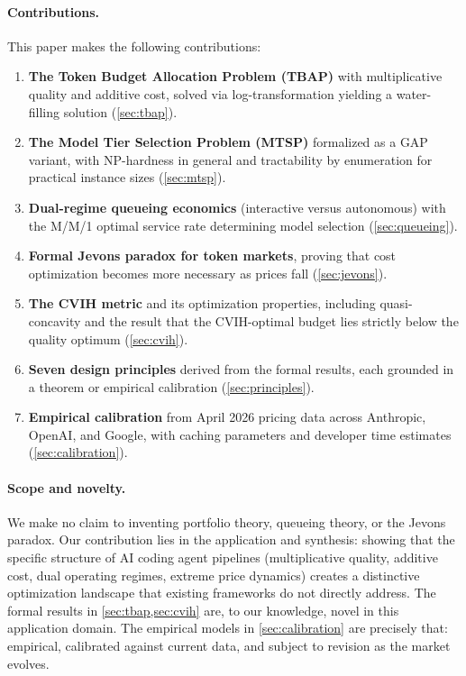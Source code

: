 \documentclass[11pt, a4paper, copyright]{googledeepmind}
\begin{document}
\paragraph{Contributions.}
This paper makes the following contributions:
\begin{enumerate}[leftmargin=*, nosep]
    \item \textbf{The Token Budget Allocation Problem (TBAP)} with multiplicative quality and additive cost, solved via log-transformation yielding a water-filling solution (\cref{sec:tbap}).
    \item \textbf{The Model Tier Selection Problem (MTSP)} formalized as a GAP variant, with NP-hardness in general and tractability by enumeration for practical instance sizes (\cref{sec:mtsp}).
    \item \textbf{Dual-regime queueing economics} (interactive versus autonomous) with the M/M/1 optimal service rate determining model selection (\cref{sec:queueing}).
    \item \textbf{Formal Jevons paradox for token markets}, proving that cost optimization becomes more necessary as prices fall (\cref{sec:jevons}).
    \item \textbf{The CVIH metric} and its optimization properties, including quasi-concavity and the result that the CVIH-optimal budget lies strictly below the quality optimum (\cref{sec:cvih}).
    \item \textbf{Seven design principles} derived from the formal results, each grounded in a theorem or empirical calibration (\cref{sec:principles}).
    \item \textbf{Empirical calibration} from April 2026 pricing data across Anthropic, OpenAI, and Google, with caching parameters and developer time estimates (\cref{sec:calibration}).
\end{enumerate}

\paragraph{Scope and novelty.}
We make no claim to inventing portfolio theory, queueing theory, or the Jevons paradox. Our contribution lies in the application and synthesis: showing that the specific structure of AI coding agent pipelines (multiplicative quality, additive cost, dual operating regimes, extreme price dynamics) creates a distinctive optimization landscape that existing frameworks do not directly address. The formal results in \cref{sec:tbap,sec:cvih} are, to our knowledge, novel in this application domain. The empirical models in \cref{sec:calibration} are precisely that: empirical, calibrated against current data, and subject to revision as the market evolves.
\end{document}
